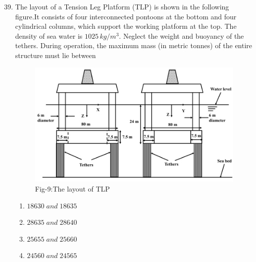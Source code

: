 \documentclass[journal]{IEEEtran}
\theoremstyle{remark}
\begin{document}
\begin{enumerate}[itemsep=1em]
\setcounter{enumi}{38}
\item The layout of a Tension Leg Platform (TLP) is shown in the following figure.It consists of four interconnected pontoons at the bottom and four cylindrical columns, which support the working platform at the top. The density of sea water is $1025 \,kg/m^3$. Neglect the weight and buoyancy of the tethers. During operation, the maximum mass (in metric tonnes) of the entire structure must lie between
\begin{figure}[H]
    \centering
    \includegraphics[width=0.6\columnwidth]{figs/fig-9.jpeg}
    \caption*{Fig-9:The layout of TLP}
    \label{fig-9}
\end{figure}
\newpage
\vspace*{0.25cm}
\begin{enumerate}[leftmargin=2.5em, labelsep=0.5em, itemsep=0.5em]
    \item $18630\;and\;18635$
    \item $28635\;and\;28640$ 
    \item $25655\;and\;25660$
    \item $24560\;and\;24565$
\end{enumerate}

\end{enumerate}
\end{document}
